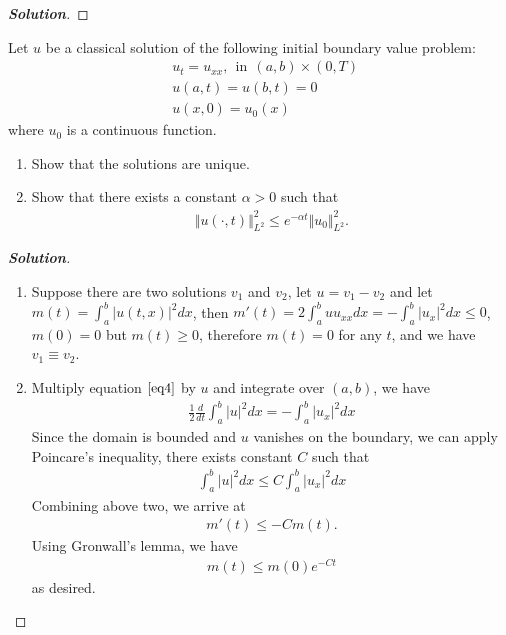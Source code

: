\documentclass[11pt,reqno]{amsart}
\newcommand{\<}{\langle}
\renewcommand{\>}{\rangle}
\newcommand{\norm}[1]{\vert#1\vert}
\newcommand{\nnorm}[1]{\Vert#1\Vert}
\begin{document}
\begin{enumerate}[label={\arabic*.}]
\begin{proof}[\bf{Solution}]
\end{proof}




\newpage
\begin{tcolorbox}
\item Let $u$ be a classical solution of the following initial boundary value problem:
\begin{align}
&
u_t = u_{xx}, \label{eq4} \ \ \text{in} \ \ (a,b)\times (0,T)\\
&
u(a,t) = u(b,t) = 0 \label{eq5 }\\
&
u(x,0) = u_0(x) \label{eq6}
\end{align}
where $u_0$ is a continuous function.
\begin{enumerate}[leftmargin=*]
\item Show that the solutions are unique.
\item Show that there exists a constant $\alpha >0$ such that 
\begin{align*}
\nnorm{u(\cdot, t)}_{L^2}^2 \leq e^{-\alpha t} \nnorm{u_0}_{L^2}^2.
\end{align*}
\end{enumerate}
\end{tcolorbox}
\bigskip


\begin{proof}[\bf{Solution}]
\leavevmode
\begin{enumerate}
\item Suppose there are two solutions $v_1$ and $v_2$, let $u=v_1 -v_2$ and let $m(t)=\int_a^b \norm{u(t,x)}^2 dx$, then $m'(t)=2\int_a^b u u_{xx} dx = -\int_a^b \norm{u_x}^2 dx \leq 0$, $m(0) = 0$ but $m(t) \geq 0$, therefore $m(t) = 0$ for any $t$, and we have $v_1 \equiv v_2$.
\item Multiply equation $\eqref{eq4}$ by $u$ and integrate over $(a,b)$, we have
\begin{align*}
\frac{1}{2} \frac{d}{dt} \int_a^b \norm{u}^2 dx = -\int_a^b \norm{u_x}^2 dx
\end{align*}
Since the domain is bounded and $u$ vanishes on the boundary, we can apply Poincare's inequality, there exists constant $C$ such that
\begin{align*}
\int_a^b \norm{u}^2 dx \leq C\int_a^b \norm{u_x}^2 dx 
\end{align*}
Combining above two, we arrive at 
\begin{align*}
m'(t) \leq -C m(t).
\end{align*}
Using Gronwall's lemma, we have 
\begin{align*}
m(t) \leq m(0) e^{-Ct}
\end{align*}
as desired.



\end{enumerate}
\end{proof}



\end{enumerate}
\end{document}
